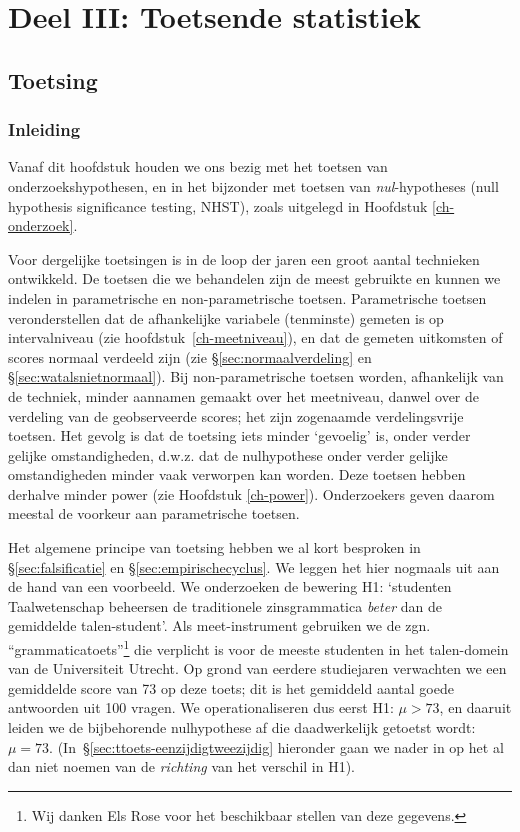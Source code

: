 \documentclass[
]{book}
\begin{document}
\part*{Deel III: Toetsende statistiek}\label{part-deel-iii-toetsende-statistiek}

\chapter{Toetsing}\label{ch-toetsing}

\section{Inleiding}\label{sec:toetsing-inleiding}

Vanaf dit hoofdstuk houden we ons bezig met het toetsen van
onderzoekshypothesen, en in het bijzonder met toetsen van
\emph{nul}-hypotheses (null hypothesis significance testing, NHST), zoals
uitgelegd in Hoofdstuk \ref{ch-onderzoek}.

Voor dergelijke toetsingen is in de loop der jaren een groot aantal
technieken ontwikkeld. De toetsen die we behandelen zijn de meest
gebruikte en kunnen we indelen in parametrische en non-parametrische
toetsen. Parametrische toetsen veronderstellen dat de afhankelijke
variabele (tenminste) gemeten is op intervalniveau (zie
hoofdstuk~\ref{ch-meetniveau}), en dat de gemeten uitkomsten of scores
normaal verdeeld zijn (zie §\ref{sec:normaalverdeling} en
§\ref{sec:watalsnietnormaal}). Bij non-parametrische toetsen worden,
afhankelijk van de techniek, minder aannamen gemaakt over het
meetniveau, danwel over de verdeling van de geobserveerde scores; het
zijn zogenaamde verdelingsvrije toetsen. Het gevolg is dat de toetsing
iets minder `gevoelig' is, onder verder gelijke omstandigheden, d.w.z.
dat de nulhypothese onder verder gelijke omstandigheden minder vaak
verworpen kan worden. Deze toetsen hebben derhalve minder power (zie
Hoofdstuk \ref{ch-power}). Onderzoekers geven daarom meestal de
voorkeur aan parametrische toetsen.

Het algemene principe van toetsing hebben we al kort besproken in
§\ref{sec:falsificatie} en §\ref{sec:empirischecyclus}. We leggen het
hier nogmaals uit aan de hand van een voorbeeld. We onderzoeken de
bewering H1: `studenten Taalwetenschap beheersen de traditionele
zinsgrammatica \emph{beter} dan de gemiddelde talen-student'. Als
meet-instrument gebruiken we de zgn. ``grammaticatoets''\footnote{Wij danken Els Rose voor het beschikbaar stellen van
  deze gegevens.}
die verplicht is voor de meeste studenten in het talen-domein van de
Universiteit Utrecht. Op grond van eerdere studiejaren verwachten we een
gemiddelde score van 73 op deze toets; dit is het gemiddeld aantal goede
antwoorden uit 100 vragen. We operationaliseren dus eerst H1:
\(\mu > 73\), en daaruit leiden we de bijbehorende nulhypothese af die
daadwerkelijk getoetst wordt: \(\mu = 73\).
(In~§\ref{sec:ttoets-eenzijdigtweezijdig} hieronder gaan we nader in op
het al dan niet noemen van de \emph{richting} van het verschil in H1).
\end{document}
